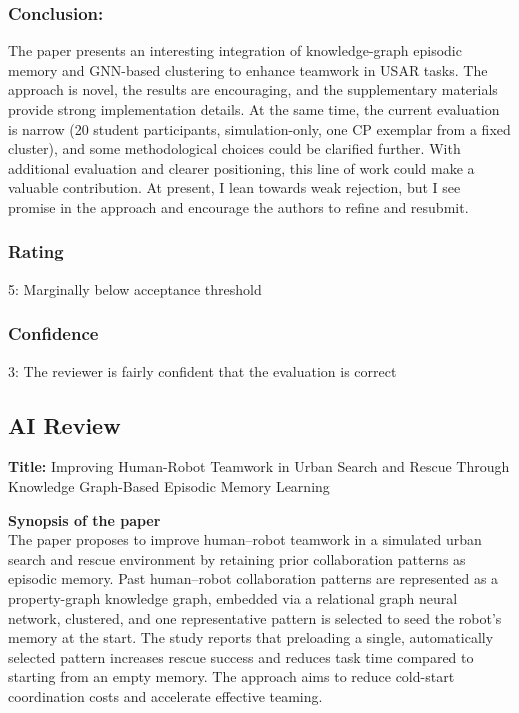 \documentclass[letterpaper]{article} %
\begin{document}
\subsubsection*{Conclusion:}
The paper presents an interesting integration of knowledge-graph episodic memory and GNN-based clustering to enhance teamwork in USAR tasks. The approach is novel, the results are encouraging, and the supplementary materials provide strong implementation details. At the same time, the current evaluation is narrow (20 student participants, simulation-only, one CP exemplar from a fixed cluster), and some methodological choices  could be clarified further. With additional evaluation and clearer positioning, this line of work could make a valuable contribution. At present, I lean towards weak rejection, but I see promise in the approach and encourage the authors to refine and resubmit.

\subsubsection*{Rating}
5: Marginally below acceptance threshold

\subsubsection*{Confidence}
3: The reviewer is fairly confident that the evaluation is correct

\subsection*{AI Review}

\textbf{Title:} Improving Human-Robot Teamwork in Urban Search and Rescue Through Knowledge Graph-Based Episodic Memory Learning

\textbf{Synopsis of the paper}\\
The paper proposes to improve human–robot teamwork in a simulated urban search and rescue environment by retaining prior collaboration patterns as episodic memory. Past human–robot collaboration patterns are represented as a property-graph knowledge graph, embedded via a relational graph neural network, clustered, and one representative pattern is selected to seed the robot’s memory at the start. The study reports that preloading a single, automatically selected pattern increases rescue success and reduces task time compared to starting from an empty memory. The approach aims to reduce cold-start coordination costs and accelerate effective teaming.
\end{document}
